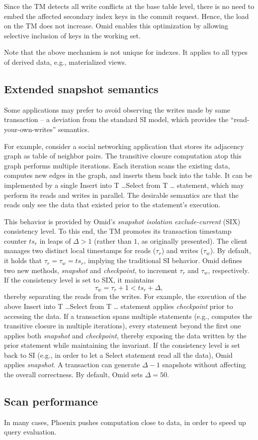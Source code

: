 Since the TM detects all write conflicts at the base table level, there is no need to embed the affected 
secondary index keys in the commit request. Hence, the load on the TM does not increase. Omid 
enables this optimization by allowing selective inclusion of keys in the working set. 

Note that the above mechanism is not unique for indexes. It applies to all types of derived data, 
e.g., materialized views. 

\subsection{Extended snapshot semantics}

Some applications may prefer to avoid observing the writes made by same transaction --
a deviation from the standard SI model, which provides the ``read-your-own-writes'' 
semantics. 

For example, consider a social networking application that stores its adjacency graph 
as table of neighbor pairs. The transitive closure computation atop this graph performs
multiple iterations. Each iteration scans the existing data, computes new edges in the 
graph, and inserts them back into the table. It can be implemented by a single 
{\sc Insert into T \ldots Select from T \ldots \/} statement, which may perform its reads and writes in parallel. 
The desirable semantics are that the reads only see the data that existed prior to the 
statement's execution. 

This behavior is provided by Omid's {\em snapshot isolation exclude-current} (SIX) 
consistency level. To this end, the TM promotes its transaction timestamp counter $ts_r$ 
in leaps of $\Delta > 1$ (rather than $1$, as originally presented).  The client manages 
two distinct local timestamps for reads ($\tau_r$) and writes ($\tau_w$). By default, 
it holds that  $\tau_r = \tau_w = ts_r$, implying the traditional SI behavior. Omid 
defines two new methods, {\em snapshot\/} and {\em checkpoint}, to increment 
$\tau_r$ and $\tau_w$, respectively. If the consistency level is set to SIX, 
it maintains 
\[
\tau_w = \tau_r+1 < ts_r+\Delta,
\]
thereby separating the reads from the writes. For example, the execution of 
the above {\sc Insert into T \ldots Select from T \ldots \/} statement applies 
{\em checkpoint\/} prior to accessing the data. If a transaction spans multiple 
statements (e.g., computes the transitive closure in multiple iterations), 
every statement beyond the first one applies both {\em snapshot\/} 
and {\em checkpoint}, thereby exposing the data written by the prior 
statement while maintaining the invariant. If the consistency level is
set back to SI (e.g., in order to let a {\sc Select\/} statement read all 
the data), Omid applies {\em snapshot\/}.  
A transaction can generate $\Delta-1$ snapshots without affecting 
the overall correctness. By default, Omid sets $\Delta=50$.  

\subsection{Scan performance} In many cases, Phoenix pushes computation close to data, in order
to speed up query evaluation.
